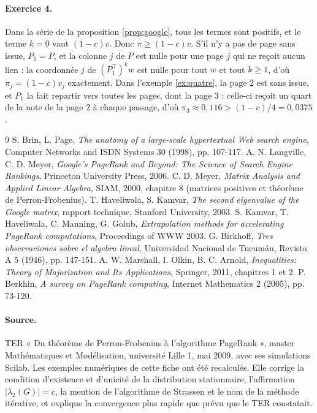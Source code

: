 \documentclass[11pt,a4paper]{article}
\theoremstyle{plain}
\theoremstyle{definition}
\theoremstyle{remark}
\begin{document}
\paragraph{Exercice 4.} Dans la série de la proposition \ref{prop:google}, tous les termes sont positifs, et le terme $k=0$ vaut $(1-c)v$. Donc $\pi\geq(1-c)v$. S'il n'y a pas de page sans issue, $P_1=P$, et la colonne $j$ de $P$ est nulle pour une page $j$ qui ne reçoit aucun lien : la coordonnée $j$ de $(P_1^\top)^kw$ est nulle pour tout $w$ et tout $k\geq1$, d'où $\pi_j=(1-c)v_j$ exactement. Dans l'exemple \ref{ex:quatre}, la page $2$ est sans issue, et $P_1$ la fait repartir vers toutes les pages, dont la page $3$ : celle-ci reçoit un quart de la note de la page $2$ à chaque passage, d'où $\pi_3\approx0{,}116>(1-c)/4=0{,}0375$.

\begin{thebibliography}{9}
 S. Brin, L. Page, \emph{The anatomy of a large-scale hypertextual Web search engine}, Computer Networks and ISDN Systems 30 (1998), pp. 107-117.
 A. N. Langville, C. D. Meyer, \emph{Google's PageRank and Beyond: The Science of Search Engine Rankings}, Princeton University Press, 2006.
 C. D. Meyer, \emph{Matrix Analysis and Applied Linear Algebra}, SIAM, 2000, chapitre 8 (matrices positives et théorème de Perron-Frobenius).
 T. Haveliwala, S. Kamvar, \emph{The second eigenvalue of the Google matrix}, rapport technique, Stanford University, 2003.
 S. Kamvar, T. Haveliwala, C. Manning, G. Golub, \emph{Extrapolation methods for accelerating PageRank computations}, Proceedings of WWW 2003.
 G. Birkhoff, \emph{Tres observaciones sobre el algebra lineal}, Universidad Nacional de Tucumán, Revista A 5 (1946), pp. 147-151.
 A. W. Marshall, I. Olkin, B. C. Arnold, \emph{Inequalities: Theory of Majorization and Its Applications}, Springer, 2011, chapitres 1 et 2.
 P. Berkhin, \emph{A survey on PageRank computing}, Internet Mathematics 2 (2005), pp. 73-120.
\end{thebibliography}

\paragraph{Source.} TER « Du théorème de Perron-Frobenius à l'algorithme PageRank », master Mathématiques et Modélisation, université Lille 1, mai 2009, avec ses simulations Scilab. Les exemples numériques de cette fiche ont été recalculés. Elle corrige la condition d'existence et d'unicité de la distribution stationnaire, l'affirmation $|\lambda_2(G)|=c$, la mention de l'algorithme de Strassen et le nom de la méthode itérative, et explique la convergence plus rapide que prévu que le TER constatait.
\end{document}
